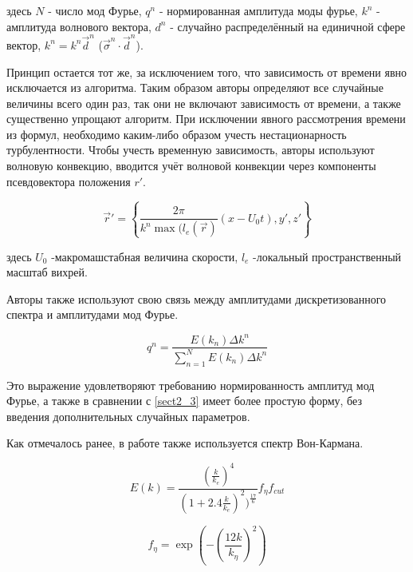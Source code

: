 здесь $N$ - число мод Фурье, $q^n$ - нормированная амплитуда моды фурье, $k^n$ - амплитуда волнового вектора, $d^n$ - случайно распределённый на единичной сфере вектор, $k^n = k^n \vec d^n$ ($\vec \sigma^n \cdot \vec d^n$). 

Принцип остается тот же, за исключением того, что зависимость от времени явно исключается из алгоритма. Таким образом авторы определяют все случайные величины всего один раз, так они не включают зависимость от времени, а также существенно упрощают алгоритм. При исключении явного рассмотрения времени из формул, необходимо каким-либо образом учесть нестационарность турбулентности. Чтобы учесть временную зависимость, авторы используют волновую конвекцию, вводится учёт волновой конвекции через компоненты псевдовектора положения $r'$.

\begin{equation}
    \label{eq:spectral_equation21}
    \vec r' = \left\{ \frac{2 \pi}{k^n \max{(l_e(\vec r)}} (x - U_0 t), y', z'\right\}
\end{equation}

здесь $U_0$ -макромашстабная величина скорости, $l_e$ -локальный пространственный масштаб вихрей.

Авторы также используют свою связь между амплитудами дискретизованного спектра и амплитудами мод Фурье.

\begin{equation}
    \label{eq:spectral_equation21_2}
    q^n = \frac{E(k_n) \Delta k^n}{\sum_{n=1}^N E(k_n) \Delta k^n}
\end{equation}

Это выражение удовлетворяют требованию нормированность амплитуд мод Фурье, а также в сравнении с \ref{sect2_3} имеет более простую форму, без введения дополнительных случайных параметров.

Как отмечалось ранее, в работе также используется спектр Вон-Кармана.

\begin{equation}
    \label{eq:spectral_equation22}
    E(k) = \frac{(\frac{k}{k_e})^4}{(1 + 2.4 \frac{k}{k_e})^2) ^ {\frac{17}{6}}} f_{\eta} f_{cut} 
\end{equation}

\begin{equation}
    \label{eq:spectral_equation23}
    f_{\eta} = \exp{(-(\frac{12 k}{k_\eta})^2)} 
\end{equation}

